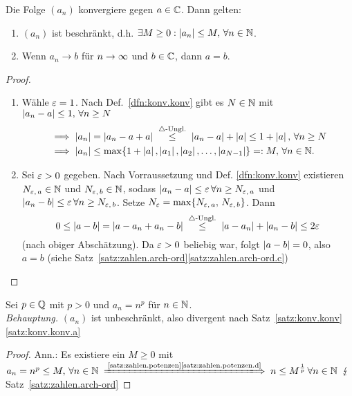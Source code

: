 \documentclass[12pt]{scrreprt}
\begin{document}
\begin{satz}
\label{satz:konv.konv}
Die Folge $(a_n)$ konvergiere gegen $a\in\mathbb{C}$. Dann gelten:
\begin{enumerate}
\item $(a_n)$ ist beschränkt, d.h. $\exists M\ge0: \left\lvert a_n\right\lvert\le M, \,\forall n\in\mathbb{N}$. \label{satz:konv.konv.a}
\item Wenn $a_n \to b$ für $n\rightarrow\infty$ und $b\in\mathbb{C}$, dann $a=b$. \label{satz:konv.konv.b}
\end{enumerate}
\end{satz}
\begin{proof}
\begin{enumerate}
\item Wähle $\varepsilon=1$. Nach Def.~\ref{dfn:konv.konv} gibt es $N\in\mathbb{N}$ mit $\left\lvert a_n-a\right\lvert\le1,\,\forall n\ge N$
\begin{align*}
&\folgt \abs{a_n}=\abs{a_n-a+a} \nach{\le}{$\triangle$-Ungl.} \abs{a_n-a}+\abs{a} \le 1+\abs{a},\,\forall n\ge N\\
&\folgt \abs{a_n} \le \max \{1+\abs{a},\abs{a_1},\abs{a_2},\dotsc,\abs{a_{N-1}}\} =: M,\,\forall \nat{n}.
\end{align*}
\item Sei $\varepsilon>0$ gegeben. Nach Vorraussetzung und Def. \ref{dfn:konv.konv} existieren $N_{\varepsilon,\,a}\in\mathbb{N}$ und $N_{\varepsilon,\,b}\in\mathbb{N}$, sodass $\left\lvert a_n-a\right\lvert\le\varepsilon\,\forall n\ge N_{\varepsilon,\,a}$ und $\left\lvert a_n-b\right\lvert\le\varepsilon\,\forall n\ge N_{\varepsilon,\,b}$. Setze $N_\varepsilon=\max \{N_{\varepsilon,\,a},\,N_{\varepsilon,\,b}\}$. Dann 
\[0\le\abs{a-b}=\abs{a-a_n+a_n-b}\nach{\le}{$\triangle$-Ungl.}\abs{a-a_n}+\abs{a_n-b}\le2\ep\]
(nach obiger Abschätzung). Da $\varepsilon>0$ beliebig war, folgt $\left\lvert a-b\right\lvert=0$, also $a=b$ (siehe Satz~\ref{satz:zahlen.arch-ord}\ref{satz:zahlen.arch-ord.c})
\end{enumerate}
\end{proof}

\begin{bsp}
\label{bsp:konv.konv.a}
Sei $p\in\mathbb{Q}$ mit $p>0$ und $a_n=n^p$ für $n\in\mathbb{N}$.\\
\emph{Behauptung.} $(a_n)$ ist unbeschränkt, also divergent nach Satz~\ref{satz:konv.konv}\ref{satz:konv.konv.a}
\begin{proof} Ann.: Es existiere ein $M\ge0$ mit $a_n=n^p\le M,\,\forall \nat{n} \folgtnach{\ref{satz:zahlen.potenzen}\ref{satz:zahlen.potenzen.d}} n\le M^{\frac1p}\,\forall \nat{n}$ \folgt $\lightning$ Satz~\ref{satz:zahlen.arch-ord} \end{proof}
\end{bsp}
\end{document}
